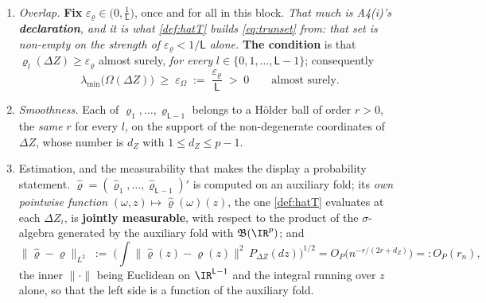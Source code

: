 \begin{assumption}\label{ass:overlap}~
\begin{enumerate}
\item[(i)] \emph{Overlap.} \textbf{Fix} $\varepsilon_\varrho\in\big(0,\tfrac1{\mathsf L}\big)$, once and
for all in this block. \emph{That much is A4(i)'s \textbf{declaration}, and it is what \cref{def:hatT}
builds \eqref{eq:trunset} from: that set is non-empty on the strength of
$\varepsilon_\varrho<1/\mathsf L$ alone.} \textbf{The condition} is that
$\varrho_l(\Delta Z)\ge\varepsilon_\varrho$ almost surely, \emph{for every}
$l\in\{0,1,\dots,\mathsf L-1\}$; consequently
\begin{equation}\label{eq:omegafloor}
\lambda_{\min}\big(\Omega(\Delta Z)\big)\;\ge\;\varepsilon_\Omega\;:=\;\frac{\varepsilon_\varrho}{\mathsf L}\;>\;0
\qquad\text{almost surely.}
\end{equation}
\item[(ii)] \emph{Smoothness.} Each of $\varrho_1,\dots,\varrho_{\mathsf L-1}$ belongs to a H\"older ball
of order $r>0$, the \emph{same} $r$ for every $l$, on the support of the
non-degenerate coordinates of $\Delta Z$, whose number is $d_Z$ with $1\le d_Z\le p-1$.
\item[(iii)] Estimation, and the measurability that makes the display a probability statement.
$\hat\varrho=(\hat\varrho_1,\dots,\hat\varrho_{\mathsf L-1})'$ is computed on an auxiliary fold; its
\emph{own pointwise function}
$(\omega,z)\mapsto\hat\varrho(\omega)(z)$, the one \cref{def:hatT} evaluates at each $\Delta Z_i$, is
\textbf{jointly measurable}, with respect to the product of the $\sigma$-algebra generated by the
auxiliary fold with $\mathfrak B(\IR^{p})$; and
\[
\big\|\hat\varrho-\varrho\big\|_{L^2}
\;:=\;\Big(\int\big\|\hat\varrho(z)-\varrho(z)\big\|^{2}\,P_{\Delta Z}(dz)\Big)^{1/2}
=O_P\big(n^{-r/(2r+d_Z)}\big)=:O_P(r_n),
\]
the inner $\|\cdot\|$ being Euclidean on $\IR^{\mathsf L-1}$ and the integral running over $z$ alone, so
that the left side is a function of the auxiliary fold.
\end{enumerate}
\end{assumption}

